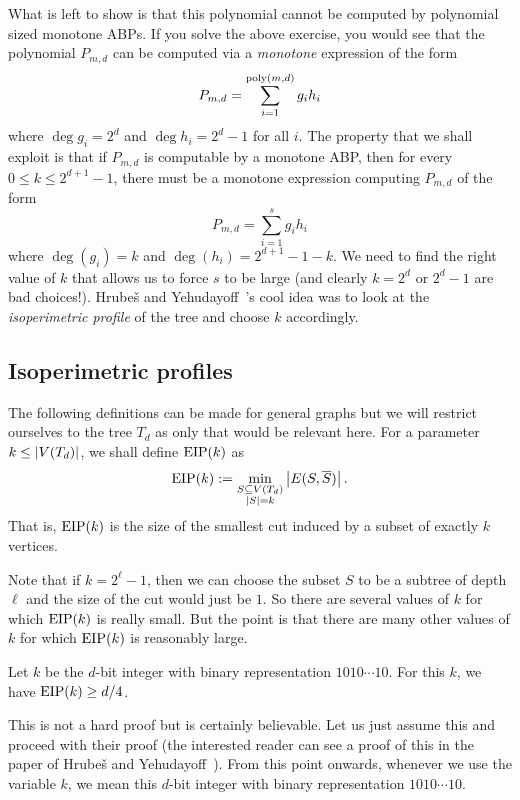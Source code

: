 What is left to show is that this polynomial cannot be computed by polynomial sized monotone ABPs. If you solve the above exercise, you would see that the polynomial $P_{m,d}$ can be computed via a \emph{monotone} expression of the form
\[
  P_{m,d} = \sum_{i=1}^{\operatorname{poly}(m,d)} g_i h_i
\]
where $\deg g_i = 2^d$ and $\deg h_i = 2^{d}-1$ for all $i$. The property that we shall exploit is that if $P_{m,d}$ is computable by a monotone ABP, then for every $0\leq k \leq 2^{d+1} - 1$, there must be a monotone expression computing $P_{m,d}$ of the form
\[
P_{m,d} = \sum_{i=1}^{s} g_i h_i
\]
where $\deg(g_i) = k$ and $\deg(h_i) = 2^{d+1} - 1 - k$. We need to find the right value of $k$ that allows us to force $s$ to be large (and clearly $k = 2^d$ or $2^{d} -1$ are bad choices!). Hrube\v{s} and Yehudayoff~\cite{HY16}'s cool idea was to look at the \emph{isoperimetric profile} of the tree and choose $k$ accordingly.

\subsection{Isoperimetric profiles}

The following definitions can be made for general graphs but we will restrict ourselves to the tree $T_d$ as only that would be relevant here. For a parameter $k \leq \left|V(T_d)\right|$, we shall define $\operatorname{EIP}(k)$ as
\[
  \operatorname{EIP}(k) := \min_{\substack{S\subseteq V(T_d)\\|S| = k}} \left|E(S,\overline{S})\right|.
\]
That is, $\operatorname{EIP}(k)$ is the size of the smallest cut induced by a subset of exactly $k$ vertices.

Note that if $k = 2^\ell - 1$, then we can choose the subset $S$ to be a subtree of depth $\ell$ and the size of the cut would just be $1$.
So there are several values of $k$ for which $\operatorname{EIP}(k)$ is really small.
But the point is that there are many other values of $k$ for which $\operatorname{EIP}(k)$ is reasonably large.

\begin{lemma}\label{lem:eip-for-good-k}
  Let $k$ be the $d$-bit integer with binary representation $1010\cdots 10$. For this $k$, we have $\operatorname{EIP}(k) \geq d/4$.
\end{lemma}

This is not a hard proof but is certainly believable. Let us just assume this and proceed with their proof (the interested reader can see a proof of this in the paper of Hrube\v{s} and Yehudayoff~\cite{HY16}). From this point onwards, whenever we use the variable $k$, we mean this $d$-bit integer with binary representation $1010\cdots10$.

